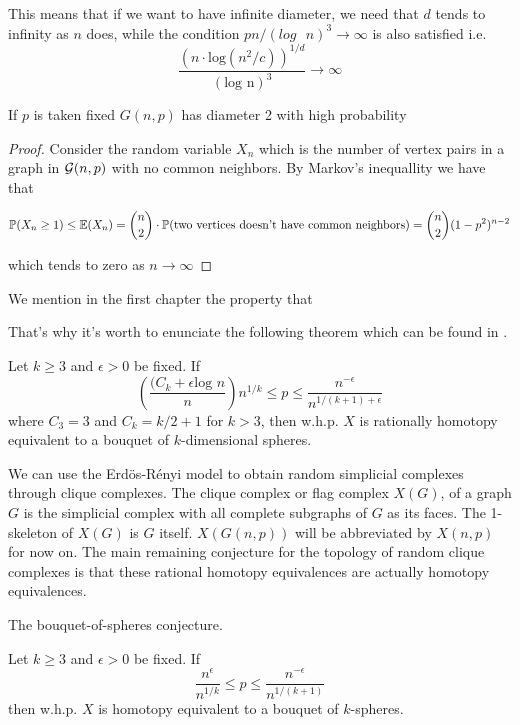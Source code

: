 This means that if we want to have infinite diameter, we need that $d$ tends to infinity as $n$ does, while the condition $pn/(log\text{ }n)^{3} \to \infty$ is also satisfied i.e.
$$ \frac{(n\cdot\text{log}(n^{2}/c))^{1/d}}{(\text{log n})^{3}} \to \infty$$

  

\begin{theorem}
If $p$ is taken fixed $G(n,p)$ has diameter 2 with high probability 
\end{theorem}

\begin{proof}
Consider the random variable $X_{n}$ which is the number of vertex pairs in a graph in $\mathcal{G}(n,p)$ with no common neighbors. By Markov's inequallity we have that

$$\mathbb{P}(X_{n} \geq 1)\leq \mathbb{E}(X_{n}) = \binom{n}{2} \cdot \mathbb{P}(\text{two vertices doesn't have common neighbors}) = \binom{n}{2} (1-p^{2})^{n-2}$$

which tends to zero as $n\to \infty$
\end{proof}


We mention in the first chapter the property that 


That's why it's worth to enunciate the following theorem which can be found in \cite[Khale, 16]{Khale}.
\begin{theorem}
Let $k \geq 3$ and $\epsilon > 0$ be fixed. If
$$\left(\frac{(C_{k} + \epsilon \text{log } n} {n} \right) n^{1/k} \leq p \leq \frac{n^{-\epsilon}}{n^{1/(k+1)+\epsilon}}$$
where $C_{3} = 3$ and $C_{k} = k/2 + 1$ for $k > 3$, then w.h.p. $X$ is rationally homotopy
equivalent to a bouquet of $k$-dimensional spheres.
\end{theorem}

We can use the Erdös-Rényi model to obtain random simplicial complexes through clique complexes. The clique complex or flag complex $X(G)$, of a graph $G$ is the simplicial complex with all complete subgraphs of $G$ as its faces. The 1-skeleton of $X(G)$ is $G$ itself. $X(G(n, p))$ will be abbreviated by $X(n, p)$ for now on.
The main remaining conjecture for the topology of random clique complexes is that these rational homotopy equivalences are actually homotopy equivalences.

\begin{conje}
The bouquet-of-spheres conjecture.

Let $k \geq 3$ and $\epsilon > 0$ be fixed. If
$$\frac{n^{\epsilon}}{n^{1/k}} \leq p \leq \frac{n^{-\epsilon}}{n^{1/(k+1)}}$$
then w.h.p. $X$ is homotopy equivalent to a bouquet of $k$-spheres.
\end{conje}